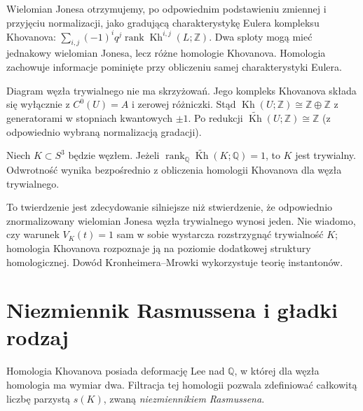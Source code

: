 \begin{uwaga}[Kategoryfikacja]
Wielomian Jonesa otrzymujemy, po odpowiednim podstawieniu
zmiennej i przyjęciu normalizacji, jako gradującą
charakterystykę Eulera kompleksu Khovanova:
$\sum_{i,j}(-1)^i q^j\operatorname{rank}
\operatorname{Kh}^{i,j}(L;\mathbb Z)$.
Dwa sploty mogą mieć jednakowy wielomian Jonesa, lecz
różne homologie Khovanova. Homologia zachowuje informacje
pominięte przy obliczeniu samej charakterystyki Eulera.
\end{uwaga}

\begin{przyklad}
Diagram węzła trywialnego nie ma skrzyżowań.
Jego kompleks Khovanova składa się wyłącznie z
$C^0(U)=A$ i zerowej różniczki. Stąd
$\operatorname{Kh}(U;\mathbb Z)\cong\mathbb Z\oplus\mathbb Z$
z generatorami w stopniach kwantowych $\pm1$.
Po redukcji $\widetilde{\operatorname{Kh}}(U;\mathbb Z)
\cong\mathbb Z$ (z odpowiednio wybraną normalizacją gradacji).
\end{przyklad}

\begin{twierdzenie}
Niech $K\subset S^3$ będzie węzłem. Jeżeli
$\operatorname{rank}_{\mathbb Q}
\widetilde{\operatorname{Kh}}(K;\mathbb Q)=1$,
to $K$ jest trywialny. Odwrotność wynika bezpośrednio
z obliczenia homologii Khovanova dla węzła trywialnego.
\end{twierdzenie}

\begin{uwaga}
To twierdzenie jest zdecydowanie silniejsze niż
stwierdzenie, że odpowiednio znormalizowany wielomian
Jonesa węzła trywialnego wynosi jeden. Nie wiadomo,
czy warunek $V_K(t)=1$ sam w sobie wystarcza
rozstrzygnąć trywialność $K$; homologia Khovanova
rozpoznaje ją na poziomie dodatkowej struktury homologicznej.
Dowód Kronheimera--Mrowki wykorzystuje teorię instantonów.
\end{uwaga}

\section{Niezmiennik Rasmussena i gładki rodzaj}
\label{sec:kt-rasmussen}

Homologia Khovanova posiada deformację Lee nad $\mathbb Q$,
w której dla węzła homologia ma wymiar dwa. Filtracja
tej homologii pozwala zdefiniować całkowitą liczbę parzystą
$s(K)$, zwaną \emph{niezmiennikiem Rasmussena}.

